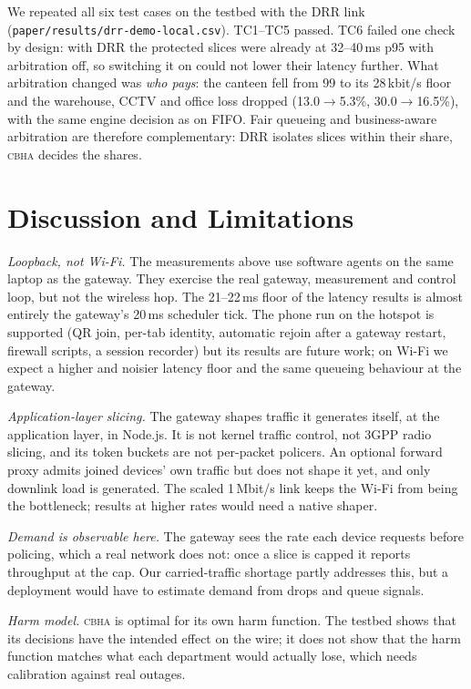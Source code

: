 \documentclass[conference]{IEEEtran}
\newcommand{\cbha}{\textsc{cbha}}
\newcommand{\kbps}{\,kbit/s}
\begin{document}
We repeated all six test cases on the testbed with the DRR link (\texttt{paper/results/drr-demo-local.csv}). TC1--TC5 passed. TC6 failed one check by design: with DRR the protected slices were already at 32--40\,ms p95 with arbitration off, so switching it on could not lower their latency further. What arbitration changed was \emph{who pays}: the canteen fell from 99 to its 28\kbps{} floor and the warehouse, CCTV and office loss dropped (13.0$\rightarrow$5.3\%, 30.0$\rightarrow$16.5\%), with the same engine decision as on FIFO. Fair queueing and business-aware arbitration are therefore complementary: DRR isolates slices within their share, \cbha{} decides the shares.


\section{Discussion and Limitations}
\label{sec:disc}

\textit{Loopback, not Wi-Fi.} The measurements above use software agents on the same laptop as the gateway. They exercise the real gateway, measurement and control loop, but not the wireless hop. The 21--22\,ms floor of the latency results is almost entirely the gateway's 20\,ms scheduler tick. The phone run on the hotspot is supported (QR join, per-tab identity, automatic rejoin after a gateway restart, firewall scripts, a session recorder) but its results are future work; on Wi-Fi we expect a higher and noisier latency floor and the same queueing behaviour at the gateway.

\textit{Application-layer slicing.} The gateway shapes traffic it generates itself, at the application layer, in Node.js. It is not kernel traffic control, not 3GPP radio slicing, and its token buckets are not per-packet policers. An optional forward proxy admits joined devices' own traffic but does not shape it yet, and only downlink load is generated. The scaled 1\,Mbit/s link keeps the Wi-Fi from being the bottleneck; results at higher rates would need a native shaper.

\textit{Demand is observable here.} The gateway sees the rate each device requests before policing, which a real network does not: once a slice is capped it reports throughput at the cap. Our carried-traffic shortage partly addresses this, but a deployment would have to estimate demand from drops and queue signals.

\textit{Harm model.} \cbha{} is optimal for its own harm function. The testbed shows that its decisions have the intended effect on the wire; it does not show that the harm function matches what each department would actually lose, which needs calibration against real outages.
\end{document}
